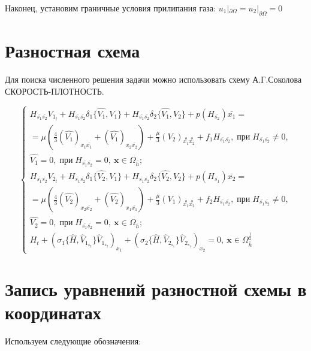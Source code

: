\documentclass[specialist,subf,href,colorlinks=true,12pt
,times,mtpro,specialist
]{disser}
\begin{document}
Наконец, установим граничные условия прилипания газа: ${u_1}|_{\partial \Omega} = {u_2}|_{\partial \Omega} = 0$

\section {Разностная схема}

Для поиска численного решения задачи можно использовать схему А.Г.Соколова СКОРОСТЬ-ПЛОТНОСТЬ.

\begin{equation}
\begin{cases}
H_{\bar{s_1} \bar{s_2}}V_{1_t} + H_{\bar{s_1} \bar{s_2}}\delta_1\{\hat{V_1}, V_1\} + H_{\bar{s_1} \bar{s_2}}\delta_2\{\hat{V_1}, V_2\} + p(H_{\bar{s_2}})\bar{x_1} = \\
 = \mu(\frac{4}{3}(\hat{V_1})_{x_1\bar{x_1}} + (\hat{V_1})_{x_2\bar{x_2}}) + \frac{\mu}{3}(V_2)_{\stackrel{o}{x_1} \stackrel{o}{x_2}} + f_1H_{\bar{s_1} \bar{s_2}},\; \text{при}\; H_{\bar{s_1} \bar{s_2}} \ne 0,  \\ 
 \hat{V_1} = 0,\; \text{при}\; H_{\bar{s_1} \bar{s_2}} = 0,\ \boldsymbol{x} \in \Omega_{\bar{h}}; \\
 
 H_{\bar{s_1} \bar{s_2}}V_{2_t} + H_{\bar{s_1} \bar{s_2}}\delta_1\{\hat{V_2}, V_1\} + H_{\bar{s_1} \bar{s_2}}\delta_2\{\hat{V_2}, V_2\} + p(H_{\bar{s_1}})\bar{x_2} = \\
 = \mu(\frac{4}{3}(\hat{V_2})_{x_2\bar{x_2}} + (\hat{V_2})_{x_1\bar{x_1}}) + \frac{\mu}{3}(V_1)_{\stackrel{o}{x_1} \stackrel{o}{x_2}} + f_2H_{\bar{s_1} \bar{s_2}},\; \text{при}\; H_{\bar{s_1} \bar{s_2}} \ne 0,  \\ 
 \hat{V_2} = 0,\; \text{при}\; H_{\bar{s_1} \bar{s_2}} = 0,\ \boldsymbol{x} \in \Omega_{\bar{h}}; \\
 
 H_t + (\sigma_1\{\hat{H}, \hat{V}_{1_{s_2}}\}\hat{V}_{1_{s_2}})_{x_1} + (\sigma_2\{\hat{H}, \hat{V}_{2_{s_1}}\}\hat{V}_{2_{s_1}})_{x_2} = 0,\ \boldsymbol{x} \in \Omega_{\bar{h}}^\frac{1}{2}
 \end{cases}
\end{equation} 

\section {Запись уравнений разностной схемы в координатах}

\noindent Используем следующие обозначения: 
\end{document}
